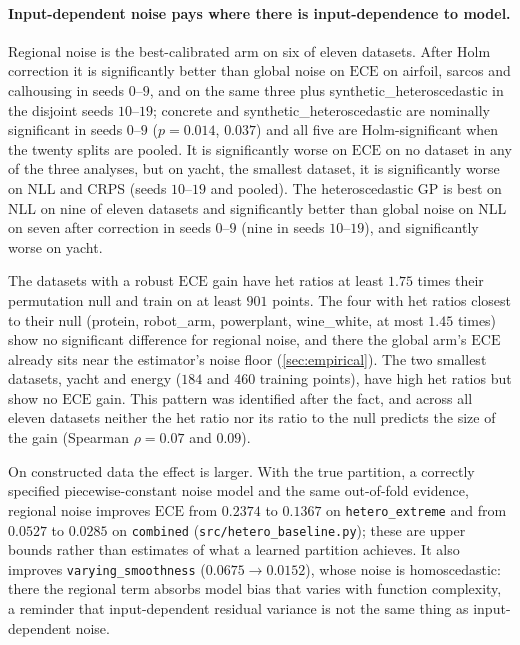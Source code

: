 \documentclass[11pt]{article}
\newcommand{\ece}{\mathrm{ECE}}
\begin{document}
\paragraph{Input-dependent noise pays where there is input-dependence to model.}
Regional noise is the best-calibrated arm on six of eleven datasets. After Holm
correction it is significantly better than global noise on $\ece$ on airfoil, sarcos
and calhousing in seeds $0$--$9$, and on the same three plus
synthetic\_heteroscedastic in the disjoint seeds $10$--$19$; concrete and
synthetic\_heteroscedastic are nominally significant in seeds $0$--$9$ ($p=0.014$,
$0.037$) and all five are Holm-significant when the twenty splits are pooled. It is
significantly worse on $\ece$ on no dataset in any of the three analyses, but on yacht,
the smallest dataset, it is significantly worse on NLL and CRPS (seeds $10$--$19$ and
pooled). The heteroscedastic GP is best on NLL on nine of eleven datasets
and significantly better than global noise on NLL on seven after correction in seeds
$0$--$9$ (nine in seeds $10$--$19$), and significantly worse on yacht.

The datasets with a robust $\ece$ gain have het ratios at least $1.75$ times their
permutation null and train on at least $901$ points. The four with het ratios closest
to their null (protein, robot\_arm, powerplant, wine\_white, at most $1.45$ times) show
no significant difference for regional noise, and there the global arm's $\ece$
already sits near the estimator's noise floor (\cref{sec:empirical}). The two smallest
datasets, yacht and energy ($184$ and $460$ training points), have high het ratios but
show no $\ece$ gain. This pattern was identified after the fact, and across all eleven
datasets neither the het ratio nor its ratio to the null predicts the size of the gain
(Spearman $\rho=0.07$ and $0.09$).

On constructed data the effect is larger. With the true partition, a correctly
specified piecewise-constant noise model and the same out-of-fold evidence, regional
noise improves $\ece$ from $0.2374$ to $0.1367$ on \texttt{hetero\_extreme} and from
$0.0527$ to $0.0285$ on \texttt{combined} (\texttt{src/hetero\_baseline.py}); these are
upper bounds rather than estimates of what a learned partition achieves. It also
improves \texttt{varying\_smoothness} ($0.0675 \to 0.0152$), whose noise is
homoscedastic: there the regional term absorbs model bias that varies with function
complexity, a reminder that input-dependent residual variance is not the same thing as
input-dependent noise.
\end{document}
